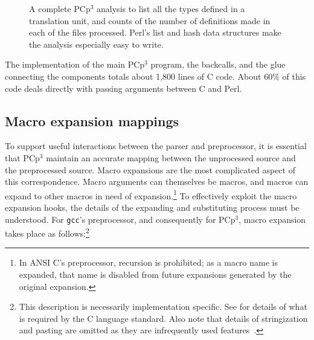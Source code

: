 \documentclass{article}
\newcommand{\pcp}{\mbox{\textsf{PCp}$^3$}}
\newcommand{\Perl}{\mbox{\textsf{Perl}}}
\newcommand{\C}{\mbox{\textsf{C}}}
\begin{document}
\begin{figure}[hbtp]
\begin{center}
\begin{small}
\end{small}
\caption{A complete \pcp{} analysis to list all the types defined in a
  translation unit, and counts of the number of definitions made in each
  of the files processed.  \Perl{}'s list and hash data structures make
  the analysis especially easy to write.}
\label{fig:complete_analysis}
\end{center}
\end{figure}


The implementation of the main \pcp{} program, the backcalls, and the
glue connecting the components totals about 1,800 lines of \C{}
code.  About 60\% of this code deals directly with passing arguments
between \C{} and \Perl{}.


\subsection{Macro expansion mappings}
To support useful interactions between the parser and preprocessor, it
is essential that \pcp{} maintain an accurate mapping between the
unprocessed source and the preprocessed source.  Macro expansions are
the most complicated aspect of this correspondence.  Macro arguments can
themselves be macros, and macros can expand to other macros in need of
expansion.\footnote{In ANSI \C{}'s preprocessor, recursion is
  prohibited; as a macro name is expanded, that name is disabled from
  future expansions generated by the original expansion.}  To
effectively exploit the macro expansion hooks, the details of the
expanding and substituting process must be understood.  For
\texttt{gcc}'s preprocessor, and consequently for \pcp{}, macro
expansion takes place as follows:\footnote{This description is necessarily
  implementation specific.  See \cite[Ch.~3]{Harbison91} for details of
  what is required by the \C{} language standard.  Also note that
  details of stringization and pasting are omitted as they are
  infrequently used features~\cite{EmpCpp}.}
\end{document}
